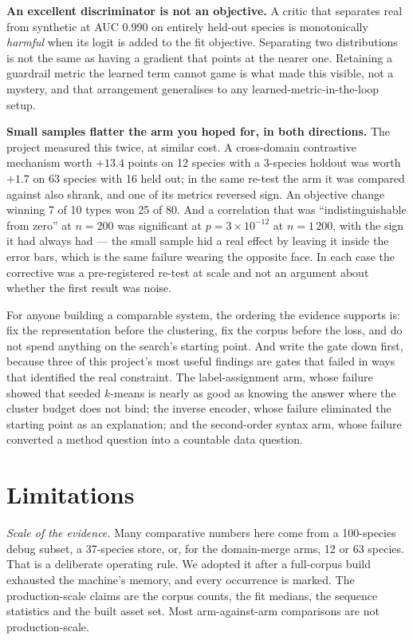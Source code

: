 \documentclass[10pt,twocolumn,a4paper]{article}
\begin{document}
\textbf{An excellent discriminator is not an objective.} A critic that separates real from
synthetic at AUC 0.990 on entirely held-out species is monotonically \emph{harmful} when its
logit is added to the fit objective. Separating two distributions is not the same as having a
gradient that points at the nearer one. Retaining a guardrail metric the learned term cannot
game is what made this visible, not a mystery, and that arrangement generalises to any
learned-metric-in-the-loop setup.

\textbf{Small samples flatter the arm you hoped for, in both directions.} The project measured
this twice, at similar cost. A cross-domain contrastive mechanism worth $+13.4$ points on 12
species with a 3-species holdout was worth $+1.7$ on 63 species with 16 held out; in the same
re-test the arm it was compared against also shrank, and one of its metrics reversed sign. An
objective change winning 7 of 10 types won 25 of 80. And a correlation that was
``indistinguishable from zero'' at $n = 200$ was significant at $p = 3\times10^{-12}$ at
$n = 1\,200$, with the sign it had always had --- the small sample hid a real effect by leaving
it inside the error bars, which is the same failure wearing the opposite face. In each case the
corrective was a
pre-registered re-test at scale and not an argument about whether the first result was
noise.

For anyone building a comparable system, the ordering the evidence supports is: fix the
representation before the clustering, fix the corpus before the loss, and do not spend
anything on the search's starting point. And write the gate down first, because three of this
project's most useful findings are gates that failed in ways that identified the real
constraint. The label-assignment arm, whose failure showed that seeded $k$-means is nearly
as good as knowing the answer where the cluster budget does not bind; the inverse encoder,
whose failure eliminated the starting point as an explanation; and the second-order syntax
arm, whose failure converted a method question into a countable data question.

\section{Limitations}
\label{sec:limitations}

\emph{Scale of the evidence.} Many comparative numbers here come from a 100-species debug
subset, a 37-species store, or, for the domain-merge arms, 12 or 63 species. That is a
deliberate operating rule. We adopted it after a full-corpus build exhausted the machine's
memory, and every occurrence is marked. The production-scale claims are the corpus counts, the
fit medians, the sequence statistics and the built asset set. Most arm-against-arm comparisons
are not production-scale.
\end{document}
